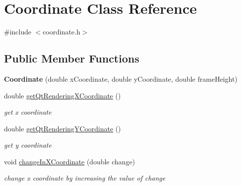 \hypertarget{class_coordinate}{}\section{Coordinate Class Reference}
\label{class_coordinate}


{\ttfamily \#include $<$coordinate.\+h$>$}

\subsection*{Public Member Functions}
\begin{DoxyCompactItemize}
\item 
\mbox{\label{class_coordinate_ac100ccbb6ae098e04a33d09695e37c27}} 
{\bfseries Coordinate} (double x\+Coordinate, double y\+Coordinate, double frame\+Height)
\item 
\mbox{\label{class_coordinate_ae29b2ae00ef197df611c9445b45a3e62}} 
double \mbox{\hyperlink{class_coordinate_ae29b2ae00ef197df611c9445b45a3e62}{get\+Qt\+Rendering\+X\+Coordinate}} ()
\begin{DoxyCompactList}\small\item\em get x coordinate \end{DoxyCompactList}\item 
\mbox{\label{class_coordinate_a04a4454970075707e98fa24abcc7fd72}} 
double \mbox{\hyperlink{class_coordinate_a04a4454970075707e98fa24abcc7fd72}{get\+Qt\+Rendering\+Y\+Coordinate}} ()
\begin{DoxyCompactList}\small\item\em get y coordinate \end{DoxyCompactList}\item 
\mbox{\label{class_coordinate_a663c89f2bcdb4efb9416df4a42d95eb5}} 
void \mbox{\hyperlink{class_coordinate_a663c89f2bcdb4efb9416df4a42d95eb5}{change\+In\+X\+Coordinate}} (double change)
\begin{DoxyCompactList}\small\item\em change x coordinate by increasing the value of change \end{DoxyCompactList}\item 
\mbox{\label{class_coordinate_a4a7edaafaee90471fa91f9e4720960a0}} 

\end{DoxyCompactItemize}
